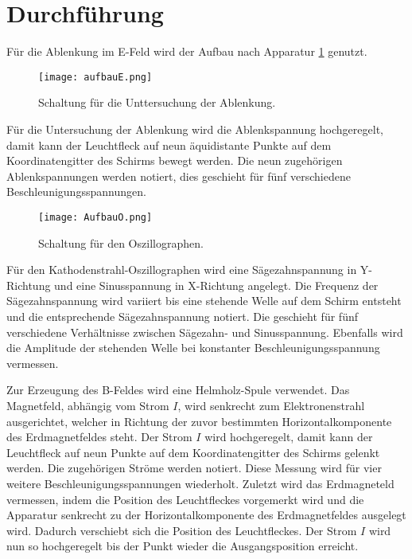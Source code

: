 \section{Durchführung}
\label{sec:Durchführung}
Für die Ablenkung im E-Feld wird der Aufbau nach Apparatur \ref{fig:aufbauE} genutzt.
\begin{figure}
 \centering
 \texttt{[image: aufbauE.png]}
 \caption{Schaltung für die Unttersuchung der Ablenkung.\cite{sample1}}
 \label{fig:aufbauE}
\end{figure}
Für die Untersuchung der Ablenkung wird die Ablenkspannung hochgeregelt, damit kann der Leuchtfleck
auf neun äquidistante Punkte auf dem Koordinatengitter des Schirms bewegt werden. Die neun zugehörigen
Ablenkspannungen werden notiert, dies geschieht für fünf verschiedene Beschleunigungsspannungen.
\begin{figure}
 \centering
 \texttt{[image: AufbauO.png]}
 \caption{Schaltung für den Oszillographen.\cite{sample1}}
 \label{fig:aufbauO}
\end{figure}
Für den Kathodenstrahl-Oszillographen wird eine Sägezahnspannung in Y-Richtung und eine Sinusspannung
in X-Richtung angelegt. Die Frequenz der Sägezahnspannung wird variiert bis eine stehende Welle auf dem Schirm entsteht
und die entsprechende Sägezahnspannung notiert.
Die geschieht für fünf verschiedene Verhältnisse zwischen Sägezahn- und Sinusspannung.
Ebenfalls wird die Amplitude der stehenden Welle bei konstanter Beschleunigungsspannung vermessen.

Zur Erzeugung des B-Feldes wird eine Helmholz-Spule verwendet. Das Magnetfeld, abhängig vom Strom $I$,
wird senkrecht zum Elektronenstrahl ausgerichtet, welcher in Richtung der zuvor bestimmten Horizontalkomponente
des Erdmagnetfeldes steht. Der Strom $I$ wird hochgeregelt, damit kann der Leuchtfleck auf neun Punkte
auf dem Koordinatengitter des Schirms gelenkt werden. Die zugehörigen Ströme werden notiert.
Diese Messung wird für vier weitere Beschleunigungsspannungen wiederholt.
Zuletzt wird das Erdmagneteld vermessen, indem die Position des Leuchtfleckes vorgemerkt wird
und die Apparatur senkrecht zu der
Horizontalkomponente des Erdmagnetfeldes ausgelegt wird.
Dadurch verschiebt sich die Position des Leuchtfleckes.
Der Strom $I$ wird nun so hochgeregelt bis der Punkt wieder die
Ausgangsposition erreicht.
